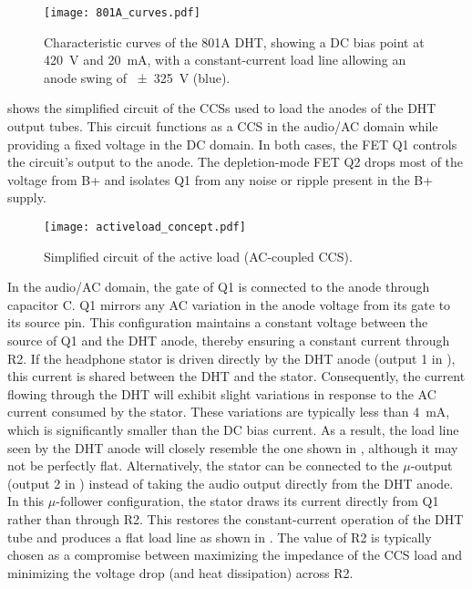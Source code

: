 \begin{figure}
\begin{center}
\texttt{[image: 801A\_curves.pdf]}
\caption{Characteristic curves of the 801A DHT, showing a DC bias point at \SI{420}{V} and \SI{20}{mA}, with a constant-current load line allowing an anode swing of \SI{\pm325}{V} (blue).}
\end{center}
\end{figure}

 shows the simplified circuit of the CCSs used to load the anodes of the DHT output tubes. This circuit functions as a CCS in the audio/AC domain while providing a fixed voltage in the DC domain. In both cases, the FET Q1 controls the circuit's output to the anode. The depletion-mode FET Q2 drops most of the voltage from B+ and isolates Q1 from any noise or ripple present in the B+ supply.\par

\begin{figure}
\begin{center}
\texttt{[image: activeload\_concept.pdf]}
\caption{Simplified circuit of the active load (AC-coupled CCS).}
\end{center}
\end{figure}

In the audio/AC domain, the gate of Q1 is connected to the anode through capacitor C. Q1 mirrors any AC variation in the anode voltage from its gate to its source pin. This configuration maintains a constant voltage between the source of Q1 and the DHT anode, thereby ensuring a constant current through R2. If the headphone stator is driven directly by the DHT anode (output 1 in ), this current is shared between the DHT and the stator. Consequently, the current flowing through the DHT will exhibit slight variations in response to the AC current consumed by the stator. These variations are typically less than \SI{4}{mA}\cite{osdeha_p8}, which is significantly smaller than the DC bias current. As a result, the load line seen by the DHT anode will closely resemble the one shown in , although it may not be perfectly flat. Alternatively, the stator can be connected to the $\mu$-output (output 2 in ) instead of taking the audio output directly from the DHT anode. In this $\mu$-follower configuration\cite{pimm_ccs,kimmel_mustage}, the stator draws its current directly from Q1 rather than through R2. This restores the constant-current operation of the DHT tube and produces a flat load line as shown in . The value of R2 is typically chosen as a compromise between maximizing the impedance of the CCS load and minimizing the voltage drop (and heat dissipation) across R2\cite{muresistorvalue}.

